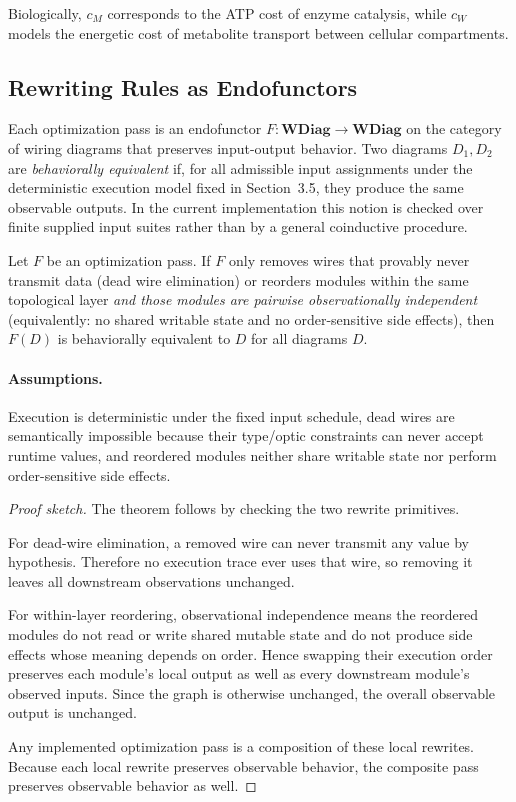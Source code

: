 Biologically, $c_M$ corresponds to the ATP cost of enzyme catalysis,
while $c_W$ models the energetic cost of metabolite transport between
cellular compartments.

\subsection{Rewriting Rules as Endofunctors}

Each optimization pass is an endofunctor $F : \mathbf{WDiag} \to \mathbf{WDiag}$
on the category of wiring diagrams that preserves input-output behavior.
Two diagrams $D_1, D_2$ are \emph{behaviorally equivalent} if, for all
admissible input assignments under the deterministic execution model fixed
in Section~3.5, they produce the same observable outputs. In the current
implementation this notion is checked over finite supplied input suites
rather than by a general coinductive procedure.

\begin{theorem}\label{thm:optimization-soundness}
Let $F$ be an optimization pass. If $F$ only removes wires that provably
never transmit data (dead wire elimination) or reorders modules within
the same topological layer \emph{and those modules are pairwise observationally independent} (equivalently: no shared writable state and no order-sensitive side effects), then $F(D)$ is
behaviorally equivalent to $D$ for all diagrams $D$.
\end{theorem}

\paragraph{Assumptions.}
Execution is deterministic under the fixed input schedule, dead wires are semantically impossible because their type/optic constraints can never accept runtime values, and reordered modules neither share writable state nor perform order-sensitive side effects.

\begin{proof}[Proof sketch]
The theorem follows by checking the two rewrite primitives.

For dead-wire elimination, a removed wire can never transmit any value by hypothesis. Therefore no execution trace ever uses that wire, so removing it leaves all downstream observations unchanged.

For within-layer reordering, observational independence means the reordered modules do not read or write shared mutable state and do not produce side effects whose meaning depends on order. Hence swapping their execution order preserves each module's local output as well as every downstream module's observed inputs. Since the graph is otherwise unchanged, the overall observable output is unchanged.

Any implemented optimization pass is a composition of these local rewrites. Because each local rewrite preserves observable behavior, the composite pass preserves observable behavior as well.
\end{proof}

